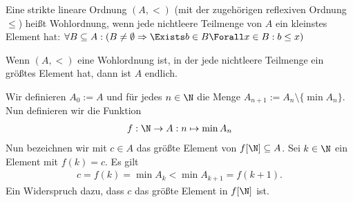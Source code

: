 Eine strikte lineare Ordnung $(A, <)$ (mit der zugehörigen reflexiven Ordnung $\leq$) heißt Wohlordnung, wenn jede nichtleere Teilmenge von $A$ ein kleinstes Element hat: $\forall B \subseteq A: (B \neq \emptyset \Rightarrow \Exists b \in B \Forall x \in B: b \leq x)$


\begin{exercise}[237]

\phantom{}
	Wenn $(A, <)$ eine Wohlordnung ist, in der jede nichtleere Teilmenge ein größtes Element hat, dann ist $A$ endlich.

\end{exercise}


\begin{solution}

\phantom{}
	Wir definieren $A_0 := A$ und für jedes $n \in \N$ die Menge $A_{n + 1} := A_n \setminus \{\min A_n\}$. Nun definieren wir die Funktion
	\begin{align*}
		f:\N \to A: n \mapsto \min A_n
	\end{align*}
	Nun bezeichnen wir mit $c \in A$ das größte Element von $f[\N] \subseteq A$. Sei $k \in \N$ ein Element mit $f(k) = c$. Es gilt 
	\begin{align*}
		c = f(k) = \min A_k < \min A_{k + 1} = f(k + 1).
	\end{align*}
	Ein Widerspruch dazu, dass $c$ das größte Element in $f[\N]$ ist. 

\end{solution}
